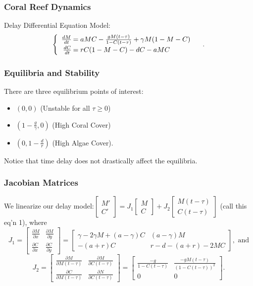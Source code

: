 \documentclass{beamer}
\begin{document}
\begin{frame}\frametitle{Coral Reef Dynamics}
Delay Differential Equation Model:
$$\begin{cases}
\begin{array}{rl}
\frac{dM}{dt}\hspace{-.8em}&=aMC - \frac{gM(t-\tau)}{1-C(t-\tau)} + \gamma M (1-M-C)\\
\frac{dC}{dt}\hspace{-.8em}&=rC(1-M-C) - dC - aMC\\
\end{array}
\end{cases}.$$
\end{frame}

\begin{frame}
\frametitle{Equilibria and Stability}
There are three equilibrium points of interest: \begin{itemize}
\item $(0,0)$ (Unstable for all $\tau\geq0$)\\
\item $(1-\frac{g}{\gamma},0)$ (High Coral Cover)\\
\item $(0,1-\frac{d}{r})$ (High Algae Cover).
\end{itemize} Notice that time delay does not drastically affect the equilibria.
\end{frame}

\begin{frame}\frametitle{Jacobian Matrices}
We linearize our delay model:{\small $\begin{bmatrix} M'\\C'\end{bmatrix}=J_1\begin{bmatrix} M\\C\end{bmatrix}+J_2\begin{bmatrix}M(t-\tau)\\C(t-\tau)\end{bmatrix}$ (call this eq'n 1), where $$J_1=\begin{bmatrix}
\frac{\partial M}{\partial x} & \frac{\partial M}{\partial y}\\
\frac{\partial C}{\partial x} & \frac{\partial C}{\partial y}
\end{bmatrix}=\begin{bmatrix}\gamma-2\gamma M +(a-\gamma)C & (a-\gamma)M\\ -(a+r)C & r-d-(a+r)-2MC \end{bmatrix}, \text{ and}$$ $$J_2=\begin{bmatrix}
\frac{\partial M}{\partial M(t-\tau)} & \frac{\partial M}{\partial C(t-\tau)}\\
\frac{\partial C}{\partial M(t-\tau)} & \frac{\partial N}{\partial C(t-\tau)}
\end{bmatrix}=\begin{bmatrix} \frac{-g}{1-C(t-\tau)} & \frac{-gM(t-\tau)}{(1-C(t-\tau))^2}\\ 0 & 0\end{bmatrix}.$$}
\end{frame}
\end{document}
